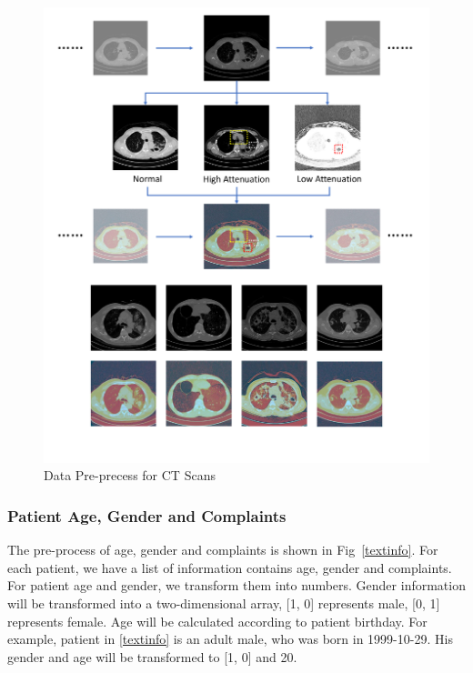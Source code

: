 \documentclass[runningheads]{llncs}
\begin{document}
\begin{figure}[htb]
    \centerline{\includegraphics[width=150mm]{3channel.pdf}}
    \vspace{-1cm}
    \caption{Data Pre-precess for CT Scans}
    \vspace{-0cm}
    \label{3channel}
    \end{figure}

\subsubsection{Patient Age, Gender and Complaints}
\label{textdata}
The pre-process of age, gender and complaints is shown in Fig~\ref{textinfo}. For each patient, we have a list of information contains age, gender and complaints. 
For patient age and gender, we transform them into numbers. Gender information will be transformed into a two-dimensional array, [1, 0] represents male, [0, 1] represents female. Age will be calculated according to patient birthday. For example, patient in \ref{textinfo} is an adult male, who was born in 1999-10-29. His gender and age will be transformed to [1, 0] and 20.
\end{document}
